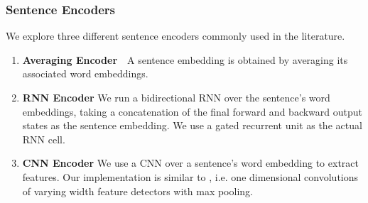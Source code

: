 
\subsubsection{Sentence Encoders}
We explore three different sentence encoders commonly used in the literature.
\begin{enumerate}
    \item \textbf{Averaging Encoder}~~A sentence embedding is obtained by
        averaging its associated word embeddings. 
    \item \textbf{RNN Encoder} We run a bidirectional RNN over the sentence's
        word embeddings, taking a concatenation of the final forward 
        and backward output states as the sentence embedding.
        We use a gated
        recurrent unit \citep{cho2014learning} as the actual RNN cell.
    \item \textbf{CNN Encoder} We use a CNN over a sentence's word embedding
        to extract \ngram{} features. Our implementation is similar to 
        \cite{kim2014convolutional}, i.e.  one dimensional convolutions of 
        varying width \ngram{} feature detectors with max pooling.
\end{enumerate}



